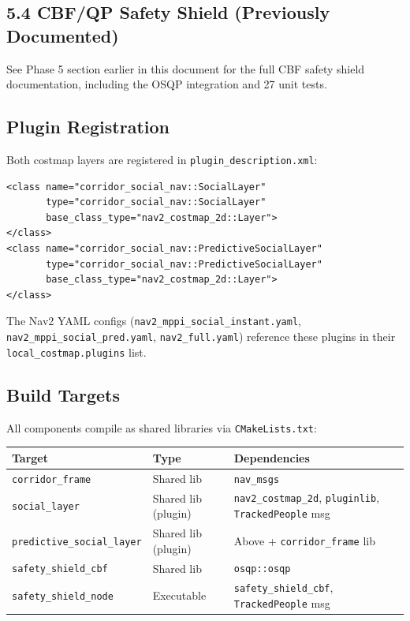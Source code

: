 \documentclass[11pt]{article}
\begin{document}
\subsection*{5.4 CBF/QP Safety Shield (Previously Documented)}

See Phase 5 section earlier in this document for the full CBF safety shield
documentation, including the OSQP integration and 27 unit tests.

\subsection*{Plugin Registration}

Both costmap layers are registered in \texttt{plugin\_description.xml}:
\begin{lstlisting}
<class name="corridor_social_nav::SocialLayer"
       type="corridor_social_nav::SocialLayer"
       base_class_type="nav2_costmap_2d::Layer">
</class>
<class name="corridor_social_nav::PredictiveSocialLayer"
       type="corridor_social_nav::PredictiveSocialLayer"
       base_class_type="nav2_costmap_2d::Layer">
</class>
\end{lstlisting}

The Nav2 YAML configs (\texttt{nav2\_mppi\_social\_instant.yaml},
\texttt{nav2\_mppi\_social\_pred.yaml}, \texttt{nav2\_full.yaml}) reference
these plugins in their \texttt{local\_costmap.plugins} list.

\subsection*{Build Targets}

All components compile as shared libraries via \texttt{CMakeLists.txt}:
\begin{center}
\begin{tabular}{llp{6cm}}
\textbf{Target} & \textbf{Type} & \textbf{Dependencies} \\
\hline
\texttt{corridor\_frame} & Shared lib & \texttt{nav\_msgs} \\
\texttt{social\_layer} & Shared lib (plugin) & \texttt{nav2\_costmap\_2d},
  \texttt{pluginlib}, \texttt{TrackedPeople} msg \\
\texttt{predictive\_social\_layer} & Shared lib (plugin) & Above +
  \texttt{corridor\_frame} lib \\
\texttt{safety\_shield\_cbf} & Shared lib & \texttt{osqp::osqp} \\
\texttt{safety\_shield\_node} & Executable & \texttt{safety\_shield\_cbf},
  \texttt{TrackedPeople} msg \\
\end{tabular}
\end{center}
\end{document}
